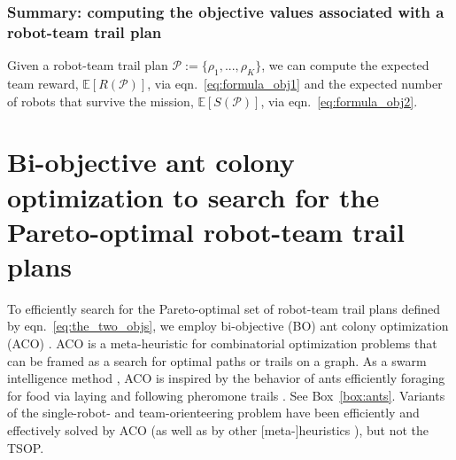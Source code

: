 \documentclass[fleqn,10pt,lineno]{wlpeerj}
\begin{document}
\subsubsection{Summary: computing the objective values associated with a robot-team trail plan}
Given a robot-team trail plan $\mathcal{P}:=\{\rho_1,...,\rho_K\}$, we can compute the expected team reward, $\mathbb{E}[R(\mathcal{P})]$, via eqn.~\ref{eq:formula_obj1} and the expected number of robots that survive the mission, $\mathbb{E}[S(\mathcal{P})]$, via eqn.~\ref{eq:formula_obj2}.



\section{Bi-objective ant colony optimization to search for the Pareto-optimal robot-team trail plans}
To efficiently search for the Pareto-optimal set of robot-team trail plans defined by eqn.~\ref{eq:the_two_objs}, we employ bi-objective (BO) ant colony optimization (ACO) \cite{iredi2001bi}. ACO \cite{dorigo2006ant,bonabeau1999swarm,blum2005ant,simon2013evolutionary} is a meta-heuristic for combinatorial optimization problems that can be framed as a search for optimal paths or trails on a graph. As a swarm intelligence method \cite{bonabeau1999swarm}, 
ACO is inspired by the behavior of ants efficiently foraging for food via laying and following pheromone trails \cite{bonabeau2000inspiration}. See Box~\ref{box:ants}. 
Variants of the single-robot- and team-orienteering problem have been efficiently and effectively solved by ACO \cite{ke2008ants,chen2015multiobjective,verbeeck2017time,sohrabi2021acs,chen2022environment,montemanni2011enhanced} (as well as by other [meta-]heuristics \cite{gavalas2014survey,dang2013effective,chao1996fast,butt1994heuristic}), but not the TSOP.
\end{document}
